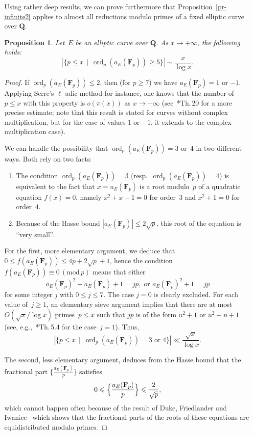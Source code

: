 \documentclass[12pt]{amsart}
\renewcommand{\leq}{\leqslant}
\renewcommand{\geq}{\geqslant}
\numberwithin{equation}{section}
\newcommand{\Qq}{\mathbf{Q}}
\newcommand{\Ff}{\mathbf{F}}
\newcommand{\mods}[1]{\,(\mathrm{mod}\,{#1})}
\DeclareMathOperator{\ord}{ord}
\theoremstyle{plain}
\newtheorem{proposition}[theorem]{Proposition}
\theoremstyle{remark}
\theoremstyle{definition}
\renewcommand{\geq}{\geqslant}
\renewcommand{\leq}{\leqslant}
\begin{document}
Using rather deep results, we can prove furthermore that
Proposition~\ref{pr-infinite2} applies to almost all reductions
modulo primes of a fixed elliptic curve over $\Qq$.
  
\begin{proposition}\label{pr-order}
  Let~$E$ be an elliptic curve over $\Qq$. As $x\to+\infty$, the following holds: 
  \[
    |\{p\leq x\,\mid\, \ord_p(a_E(\Ff_p))\geq 5\}|\sim \frac{x}{\log x}. 
  \]
\end{proposition}

\begin{proof}
  If $\ord_p(a_E(\Ff_p))\leq 2$, then (for $p\geq 7$) we have
  $a_E(\Ff_p)=1$ or $-1$. Applying Serre's $\ell$-adic method for
  instance, one knows that the number of $p\leq x$ with this property is
  $o(\pi(x))$ as $x\to +\infty$ (see~\cite{serre-chebotarev}*{Th.\,20}
  for a more precise estimate; note that this result is stated for
  curves without complex multiplication, but for the case of values $1$
  or $-1$, it extends to the complex multiplication case).

  We can handle the possibility that $\ord_p(a_E(\Ff_p))=3$ or~$4$ in two
  different ways. Both rely on two facts:
  \begin{enumerate}
  \item The condition $\ord_p(a_E(\Ff_p))=3$
    (resp.\ $\ord_p(a_E(\Ff_p))=4$) is equivalent to the fact that
    $x=a_E(\Ff_p)$ is a root modulo~$p$ of a quadratic equation
    $f(x)=0$, namely $x^2+x+1=0$ for order~$3$ and $x^2+1=0$ for
    order~$4$.
  \item Because of the Hasse bound $|a_E(\Ff_p)|\leq 2\sqrt{p}$, this
    root of the equation is ``very small''.
  \end{enumerate}

  For the first, more elementary argument, we deduce that
  $0\leq f(a_E(\Ff_p))\leq 4p+2\sqrt{p}+1$, hence the condition
  $f(a_E(\Ff_p))\equiv 0\mods{p}$ means that
  either
  \[
    a_E(\Ff_p)^2+a_E(\Ff_p)+1=jp,\text{ or }
    a_E(\Ff_p)^2+1=jp
  \]
  for some integer $j$ with $0\leq j\leq 7$. The case $j=0$ is clearly
  excluded. For each value of~$j\geq 1$, an elementary sieve argument
  implies that there are at most $O(\sqrt{x}/\log x)$ primes~$p\leq x$
  such that $jp$ is of the form $n^2+1$ or $n^2+n+1$ (see,
  e.g.,~\cite{hr}*{Th.\,5.4} for the case~$j=1$). Thus, 
  \[
    |\{p\leq x\,\mid\, \ord_p(a_E(\Ff_p))=3\text{ or } 4\}|
    \ll \frac{\sqrt{x}}{\log x}.
  \]
  
  The second, less elementary argument, deduces from the Hasse bound
  that the fractional part $\{\frac{a_E(\Ff_p)}{p}\}$ satisfies
  \[
    0\leq \Bigl\{\frac{a_E(\Ff_p)}{p}\Bigr\}\leq \frac{2}{\sqrt{p}},
  \]
  which cannot happen often because of the result of Duke, Friedlander
  and Iwaniec~\cite{dfi} which shows that the fractional parts
  of the roots of these equations are equidistributed modulo primes.
  

\end{proof}
\end{document}
